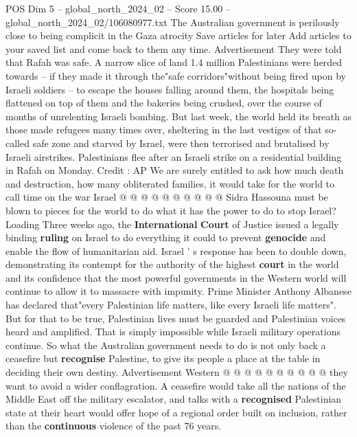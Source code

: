 \begin{textsample}{POS Dim 5 – global\_north\_2024\_02 – Score 15.00 – global\_north\_2024\_02/106080977.txt}  \label{ex:f5_pos_240}
The Australian government is perilously close to being complicit in the Gaza atrocity Save articles for later Add articles to your saved list and come back to them any time.
Advertisement They were told that Rafah was safe.
A narrow slice of land 1.4 million Palestinians were herded towards -- if they made it through the"safe corridors"without being fired upon by Israeli soldiers -- to escape the houses falling around them, the hospitals being flattened on top of them and the bakeries being crushed, over the course of months of unrelenting Israeli bombing.
But last week, the world held its breath as those made refugees many times over, sheltering in the last vestiges of that so-called safe zone and starved by Israel, were then terrorised and brutalised by Israeli airstrikes.
Palestinians flee after an Israeli strike on a residential building in Rafah on Monday.
Credit : AP We are surely entitled to ask how much death and destruction, how many obliterated families, it would take for the world to call time on the war Israel @ @ @ @ @ @ @ @ @ @ Sidra Hassouna must be blown to pieces for the world to do what it has the power to do to stop Israel?
Loading Three weeks ago, the \textbf{International} \textbf{Court} of Justice issued a legally binding \textbf{ruling} on Israel to do everything it could to prevent \textbf{genocide} and enable the flow of humanitarian aid.
Israel ' s response has been to double down, demonstrating its contempt for the authority of the highest \textbf{court} in the world and its confidence that the most powerful governments in the Western world will continue to allow it to massacre with impunity.
Prime Minister Anthony Albanese has declared that"every Palestinian life matters, like every Israeli life matters".
But for that to be true, Palestinian lives must be guarded and Palestinian voices heard and amplified.
That is simply impossible while Israeli military operations continue.
So what the Australian government needs to do is not only back a ceasefire but \textbf{recognise} Palestine, to give its people a place at the table in deciding their own destiny.
Advertisement Western @ @ @ @ @ @ @ @ @ @ they want to avoid a wider conflagration.
A ceasefire would take all the nations of the Middle East off the military escalator, and talks with a \textbf{recognised} Palestinian state at their heart would offer hope of a regional order built on inclusion, rather than the \textbf{continuous} violence of the past 76 years.

\end{textsample}
